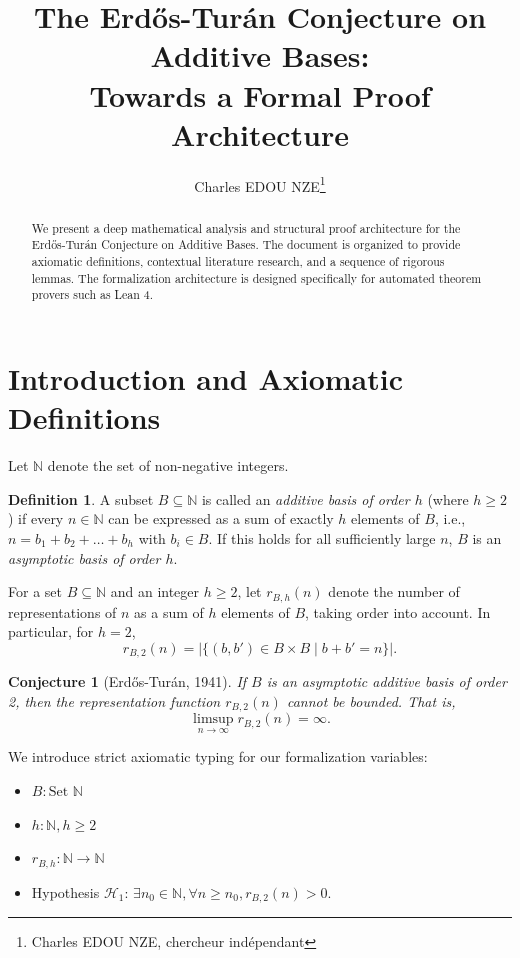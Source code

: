 \documentclass[12pt, a4paper]{article}
\title{The Erd\H{o}s-Tur\'{a}n Conjecture on Additive Bases: \\ Towards a Formal Proof Architecture}
\author{Charles EDOU NZE\thanks{Charles EDOU NZE, chercheur indépendant}}
\date{}
\newtheorem{conjecture}[theorem]{Conjecture}
\theoremstyle{definition}
\newtheorem{definition}[theorem]{Definition}
\begin{document}
\maketitle

\begin{abstract}
We present a deep mathematical analysis and structural proof architecture for the Erd\H{o}s-Tur\'{a}n Conjecture on Additive Bases. The document is organized to provide axiomatic definitions, contextual literature research, and a sequence of rigorous lemmas. The formalization architecture is designed specifically for automated theorem provers such as Lean 4.
\end{abstract}

\section{Introduction and Axiomatic Definitions}
Let $\mathbb{N}$ denote the set of non-negative integers.
\begin{definition}
A subset $B \subseteq \mathbb{N}$ is called an \emph{additive basis of order $h$} (where $h \ge 2$) if every $n \in \mathbb{N}$ can be expressed as a sum of exactly $h$ elements of $B$, i.e., $n = b_1 + b_2 + \dots + b_h$ with $b_i \in B$. If this holds for all sufficiently large $n$, $B$ is an \emph{asymptotic basis of order $h$}.
\end{definition}

For a set $B \subseteq \mathbb{N}$ and an integer $h \ge 2$, let $r_{B,h}(n)$ denote the number of representations of $n$ as a sum of $h$ elements of $B$, taking order into account. In particular, for $h=2$,
$$ r_{B,2}(n) = |\{(b, b') \in B \times B \mid b + b' = n\}|. $$

\begin{conjecture}[Erd\H{o}s-Tur\'{a}n, 1941]
If $B$ is an asymptotic additive basis of order 2, then the representation function $r_{B,2}(n)$ cannot be bounded. That is,
$$ \limsup_{n \to \infty} r_{B,2}(n) = \infty. $$
\end{conjecture}

We introduce strict axiomatic typing for our formalization variables:
\begin{itemize}
    \item $B : \text{Set } \mathbb{N}$
    \item $h : \mathbb{N}, h \ge 2$
    \item $r_{B,h} : \mathbb{N} \to \mathbb{N}$
    \item Hypothesis $\mathcal{H}_1$: $\exists n_0 \in \mathbb{N}, \forall n \ge n_0, r_{B,2}(n) > 0$.
\end{itemize}
\end{document}
